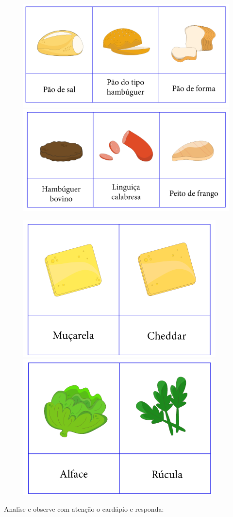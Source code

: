 \begin{figure}[htpb!]
\includegraphics[width=.5\textwidth]{../ilustracoes/MAT5/SAEB_5ANO_MAT_figura81a.png}
\includegraphics[width=.5\textwidth]{../ilustracoes/MAT5/SAEB_5ANO_MAT_figura81b.png}
\end{figure}


\begin{figure}[htpb!]
\includegraphics[width=.5\textwidth]{../ilustracoes/MAT5/SAEB_5ANO_MAT_figura81c.png}
\includegraphics[width=.5\textwidth]{../ilustracoes/MAT5/SAEB_5ANO_MAT_figura81d.png}
\end{figure}

Analise e observe com atenção o cardápio e responda:

